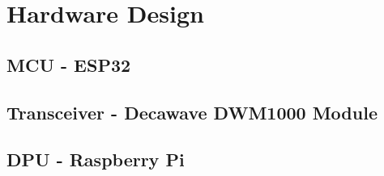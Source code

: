 

\setcounter{section}{3}
\section{Hardware Design}
\bigskip

\subsection{MCU - ESP32}

\subsection{Transceiver - Decawave DWM1000 Module} 

\subsection{DPU - Raspberry Pi}